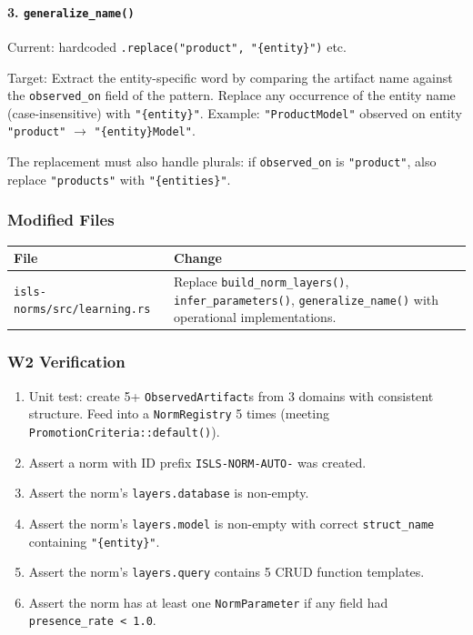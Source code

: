 \documentclass[11pt,a4paper]{article}
\begin{document}
\paragraph{3. \texttt{generalize\_name()}}

Current: hardcoded \texttt{.replace("product", "\{entity\}")} etc.

Target: Extract the entity-specific word by comparing the artifact name 
against the \texttt{observed\_on} field of the pattern. Replace any 
occurrence of the entity name (case-insensitive) with 
\texttt{"\{entity\}"}. Example: \texttt{"ProductModel"} observed on 
entity \texttt{"product"} $\to$ \texttt{"\{entity\}Model"}.

The replacement must also handle plurals: if \texttt{observed\_on} is 
\texttt{"product"}, also replace \texttt{"products"} with 
\texttt{"\{entities\}"}.

\subsubsection{Modified Files}

\begin{longtable}{lp{10cm}}
\toprule
\textbf{File} & \textbf{Change} \\
\midrule
\texttt{isls-norms/src/learning.rs}
  & Replace \texttt{build\_norm\_layers()}, \texttt{infer\_parameters()}, 
    \texttt{generalize\_name()} with operational implementations. \\
\bottomrule
\end{longtable}

\subsubsection{W2 Verification}

\begin{enumerate}[nosep]
\item Unit test: create 5+ \texttt{ObservedArtifact}s from 3 domains 
      with consistent structure. Feed into a \texttt{NormRegistry} 
      5 times (meeting \texttt{PromotionCriteria::default()}).
\item Assert a norm with ID prefix \texttt{ISLS-NORM-AUTO-} was created.
\item Assert the norm's \texttt{layers.database} is non-empty.
\item Assert the norm's \texttt{layers.model} is non-empty with correct 
      \texttt{struct\_name} containing \texttt{"\{entity\}"}.
\item Assert the norm's \texttt{layers.query} contains 5 CRUD function 
      templates.
\item Assert the norm has at least one \texttt{NormParameter} if any 
      field had \texttt{presence\_rate < 1.0}.
\end{enumerate}
\end{document}
